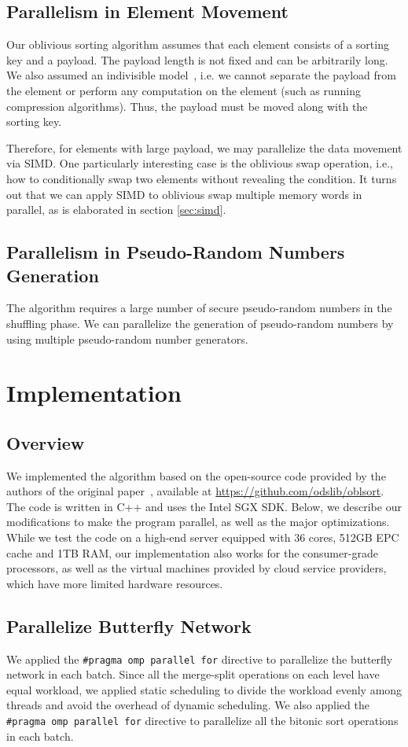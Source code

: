 \documentclass{article}
\begin{document}
\subsection{Parallelism in Element Movement}
Our oblivious sorting algorithm assumes that each element consists of a sorting key and a payload. The payload length is not fixed and can be arbitrarily long. We also assumed an indivisible model~\cite{osortsmallkey}, i.e. we cannot separate the payload from the element or perform any computation on the element (such as running compression algorithms). Thus, the payload must be moved along with the sorting key.

Therefore, for elements with large payload, we may parallelize the data movement via SIMD. One particularly interesting case is the oblivious swap operation, i.e., how to conditionally swap two elements without revealing the condition. It turns out that we can apply SIMD to oblivious swap multiple memory words in parallel, as is elaborated in section \ref{sec:simd}.

\subsection{Parallelism in Pseudo-Random Numbers Generation}
The algorithm requires a large number of secure pseudo-random numbers in the shuffling phase. We can parallelize the generation of pseudo-random numbers by using multiple pseudo-random number generators.

\section{Implementation}
\subsection{Overview}
We implemented the algorithm based on the open-source code provided by the authors of the original paper~\cite{osort}, available at \url{https://github.com/odslib/oblsort}. The code is written in C++ and uses the Intel SGX SDK. Below, we describe our modifications to make the program parallel, as well as the major optimizations. While we test the code on a high-end server equipped with 36 cores, 512GB EPC cache and 1TB RAM, our implementation also works for the consumer-grade processors, as well as the virtual machines provided by cloud service providers, which have more limited hardware resources.
\subsection{Parallelize Butterfly Network}
We applied the {\tt \#pragma omp parallel for} directive to parallelize the butterfly network in each batch. Since all the merge-split operations on each level have equal workload, we applied static scheduling to divide the workload evenly among threads and avoid the overhead of dynamic scheduling. We also applied the {\tt \#pragma omp parallel for} directive to parallelize all the bitonic sort operations in each batch.
\end{document}
